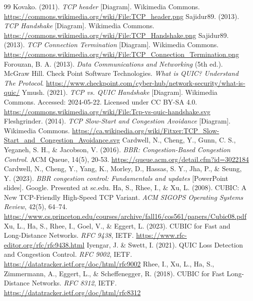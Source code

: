 \documentclass[12pt,a4paper]{article}
\begin{document}
\newpage
\begin{thebibliography}{99}
Kovako. (2011). \textit{TCP header} [Diagram]. Wikimedia Commons. \url{https://commons.wikimedia.org/wiki/File:TCP_header.png}
Sajidur89. (2013). \textit{TCP Handshake} [Diagram]. Wikimedia Commons. \url{https://commons.wikimedia.org/wiki/File:TCP_Handshake.png}
Sajidur89. (2013). \textit{TCP Connection Termination} [Diagram]. Wikimedia Commons. \url{https://commons.wikimedia.org/wiki/File:TCP_Connection_Termination.png}
Forouzan, B. A. (2013). \textit{Data Communications and Networking} (5th ed.). McGraw Hill.
Check Point Software Technologies. \textit{What is QUIC? Understand The Protocol}. \url{https://www.checkpoint.com/cyber-hub/network-security/what-is-quic/}
Ymush. (2021). \textit{TCP vs. QUIC Handshake} [Diagram]. Wikimedia Commons. Accessed: 2024-05-22. Licensed under CC BY-SA 4.0. \url{https://commons.wikimedia.org/wiki/File:Tcp-vs-quic-handshake.svg}
Fleshgrinder. (2014). \textit{TCP Slow-Start and Congestion Avoidance} [Diagram]. Wikimedia Commons. \url{https://ca.wikipedia.org/wiki/Fitxer:TCP_Slow-Start_and_Congestion_Avoidance.svg}
Cardwell, N., Cheng, Y., Gunn, C. S., Yeganeh, S. H., \& Jacobson, V. (2016). \textit{BBR: Congestion-Based Congestion Control}. ACM Queue, 14(5), 20-53. \url{https://queue.acm.org/detail.cfm?id=3022184}
Cardwell, N., Cheng, Y., Yang, K., Morley, D., Hassas, S. Y., Jha, P., \& Seung, Y. (2023). \textit{BBR congestion control: Fundamentals and updates} [PowerPoint slides]. Google. Presented at sc.edu.
Ha, S., Rhee, I., \& Xu, L. (2008). CUBIC: A New TCP-Friendly High-Speed TCP Variant. \textit{ACM SIGOPS Operating Systems Review}, 42(5), 64--74. \url{https://www.cs.princeton.edu/courses/archive/fall16/cos561/papers/Cubic08.pdf}
Xu, L., Ha, S., Rhee, I., Goel, V., \& Eggert, L. (2023). CUBIC for Fast and Long-Distance Networks. \textit{RFC 9438}, IETF. \url{https://www.rfc-editor.org/rfc/rfc9438.html}
Iyengar, J. \& Swett, I. (2021). QUIC Loss Detection and Congestion Control. \textit{RFC 9002}, IETF. \url{https://datatracker.ietf.org/doc/html/rfc9002}
Rhee, I., Xu, L., Ha, S., Zimmermann, A., Eggert, L., \& Scheffenegger, R. (2018). CUBIC for Fast Long-Distance Networks. \textit{RFC 8312}, IETF. \url{https://datatracker.ietf.org/doc/html/rfc8312}
\end{thebibliography}
\end{document}
